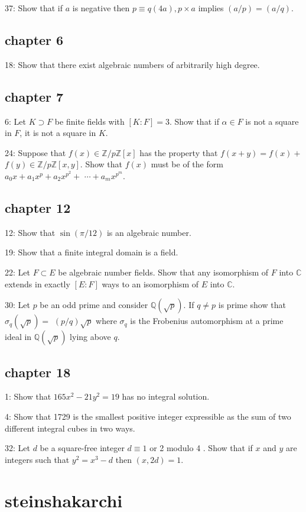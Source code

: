 \documentclass{article}
\begin{document}
37: Show that if $a$ is negative then $p \equiv q(4 a), p \times a$ implies $(a / p)=(a / q)$.

\subsection*{chapter 6}
18: Show that there exist algebraic numbers of arbitrarily high degree.

\subsection*{chapter 7}
6: Let $K \supset F$ be finite fields with $[K: F]=3$. Show that if $\alpha \in F$ is not a square in $F$, it is not a square in $K$.

24: Suppose that $f(x) \in \mathbb{Z} / p \mathbb{Z}[x]$ has the property that $f(x+y)=f(x)+$ $f(y) \in \mathbb{Z} / p \mathbb{Z}[x, y]$. Show that $f(x)$ must be of the form $a_{0} x+a_{1} x^{p}+a_{2} x^{p^{2}}+$ $\cdots+a_{m} x^{p^{m}}$.

\subsection*{chapter 12}
12: Show that $\sin (\pi / 12)$ is an algebraic number.

19: Show that a finite integral domain is a field.

22: Let $F \subset E$ be algebraic number fields. Show that any isomorphism of $F$ into $\mathbb{C}$ extends in exactly $[E: F]$ ways to an isomorphism of $E$ into $\mathbb{C}$.

30: Let $p$ be an odd prime and consider $\mathbb{Q}(\sqrt{p})$. If $q \neq p$ is prime show that $\sigma_{q}(\sqrt{p})=$ $(p / q) \sqrt{p}$ where $\sigma_{q}$ is the Frobenius automorphism at a prime ideal in $\mathbb{Q}(\sqrt{p})$ lying above $q$.

\subsection*{chapter 18}
1: Show that $165 x^{2}-21 y^{2}=19$ has no integral solution.

4: Show that 1729 is the smallest positive integer expressible as the sum of two different integral cubes in two ways.

32: Let $d$ be a square-free integer $d \equiv 1$ or 2 modulo 4 . Show that if $x$ and $y$ are integers such that $y^{2}=x^{3}-d$ then $(x, 2 d)=1$.

\section*{steinshakarchi}
\end{document}
